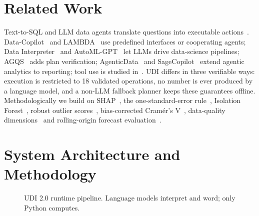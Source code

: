 \documentclass[conference]{IEEEtran}
\begin{document}
\section{Related Work}
Text-to-SQL and LLM data agents translate questions into executable actions~\cite{hong2024,tang2025,sun2024}. Data-Copilot~\cite{zhang2023} and LAMBDA~\cite{lambda2024} use predefined interfaces or cooperating agents; Data Interpreter~\cite{hong2024di} and AutoML-GPT~\cite{zhangautoml} let LLMs drive data-science pipelines; AGQS~\cite{saha2024} adds plan verification; AgenticData~\cite{sun2025agentic} and SageCopilot~\cite{liao2026} extend agentic analytics to reporting; tool use is studied in~\cite{schick2023,yao2022}. UDI differs in three verifiable ways: execution is restricted to 18 validated operations, no number is ever produced by a language model, and a non-LLM fallback planner keeps these guarantees offline. Methodologically we build on SHAP~\cite{lundberg2017,strumbelj2014}, the one-standard-error rule~\cite{hastie2009}, Isolation Forest~\cite{liu2008}, robust outlier scores~\cite{iglewicz1993}, bias-corrected Cram\'er's V~\cite{bergsma2013}, data-quality dimensions~\cite{wang1996} and rolling-origin forecast evaluation~\cite{hyndman2021}.


\section{System Architecture and Methodology}
\begin{figure}[t]
\centering
{}
\caption{UDI 2.0 runtime pipeline. Language models interpret and word; only Python computes.}
\label{fig:arch}
\end{figure}
\end{document}
